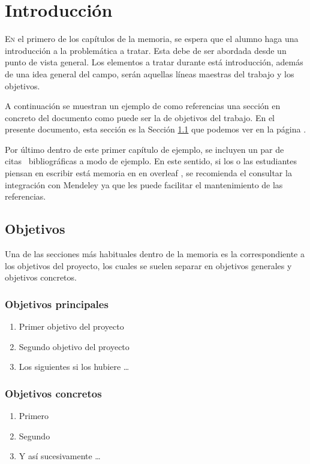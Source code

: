 \chapter{Introducción}
\label{chap:introduccion}

\lettrine{E}{n} el primero de los capítulos de la memoria, se espera 
que el alumno haga una introducción a la problemática a tratar. Esta 
debe de ser abordada desde un punto de vista general. Los elementos a
tratar durante está introducción, además de una idea general del campo,
serán aquellas líneas maestras del trabajo y los objetivos.

A continuación se muestran un ejemplo de como referencias una sección 
en concreto del documento como puede ser la de objetivos del trabajo. 
En el presente documento, esta sección es la Sección \ref{sec:objetivos}
que podemos ver en la página \pageref{sec:objetivos}.

Por último dentro de este primer capítulo de ejemplo, se incluyen un 
par de citas~\cite{RAE,RAGA, van2005student} bibliográficas a modo 
de ejemplo. En este sentido, si los o las estudiantes piensan en 
escribir está memoria en en overleaf \cite{Overleaf}, se recomienda el 
consultar la integración con Mendeley \cite{Mendeley} ya que les puede 
facilitar el mantenimiento de las referencias.

\Blindtext

\section{Objetivos}
\label{sec:objetivos}
Una de las secciones más habituales dentro de la memoria es la correspondiente a los objetivos del proyecto, los cuales se suelen separar en objetivos generales y objetivos concretos.  

\subsection{Objetivos principales}

\begin{enumerate}[label={\textbf{Objetivo \arabic*:}},leftmargin=2.5cm,labelindent=\parindent]
    \item Primer objetivo del proyecto
    \item Segundo objetivo del proyecto
    \item Los siguientes si los hubiere \ldots
\end{enumerate}

\subsection{Objetivos concretos}
\begin{enumerate}[label={\textbf{Objetivo Concreto \arabic*:}},leftmargin=4.5cm,labelindent=\parindent]
    \item Primero
    \item Segundo 
    \item Y así sucesivamente \ldots
\end{enumerate}


